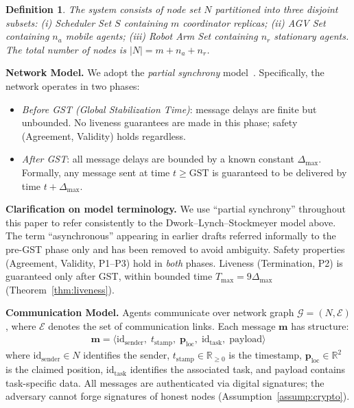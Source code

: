 \documentclass[manuscript,screen,review]{acmart}
\newtheorem{definition}{Definition}
\begin{document}
\begin{definition}
The system consists of node set $N$ partitioned into three disjoint subsets: (i) \textit{Scheduler Set} $S$ containing $m$ coordinator replicas; (ii) \textit{AGV Set} containing $n_a$ mobile agents; (iii) \textit{Robot Arm Set} containing $n_r$ stationary agents. The total number of nodes is $|N| = m + n_a + n_r$.
\end{definition}

\textbf{Network Model.}
We adopt the \textit{partial synchrony} model~\cite{dwork1988consensus}. Specifically, the network operates in two phases:
\begin{itemize}
    \item \textit{Before GST (Global Stabilization Time)}: message delays are finite but unbounded. No liveness guarantees are made in this phase; safety (Agreement, Validity) holds regardless.
    \item \textit{After GST}: all message delays are bounded by a known constant $\Delta_{\max}$. Formally, any message sent at time $t \geq \text{GST}$ is guaranteed to be delivered by time $t + \Delta_{\max}$.
\end{itemize}

\textbf{Clarification on model terminology.}
We use ``partial synchrony'' throughout this paper to refer consistently to the Dwork--Lynch--Stockmeyer model above. The term ``asynchronous'' appearing in earlier drafts referred informally to the pre-GST phase only and has been removed to avoid ambiguity. Safety properties (Agreement, Validity, P1--P3) hold in \emph{both} phases. Liveness (Termination, P2) is guaranteed only after GST, within bounded time $T_{\max} = 9\Delta_{\max}$ (Theorem~\ref{thm:liveness}).

\textbf{Communication Model.}
Agents communicate over network graph $\mathcal{G} = (N, \mathcal{E})$, where $\mathcal{E}$ denotes the set of communication links. Each message $\mathbf{m}$ has structure:
\begin{equation}
\begin{aligned}
\mathbf{m} = \langle \text{id}_{\text{sender}},\; t_{\text{stamp}},\; \mathbf{p}_{\text{loc}},\; \text{id}_{\text{task}},\; \text{payload} \rangle
\end{aligned}
\end{equation}
where $\text{id}_{\text{sender}} \in N$ identifies the sender, $t_{\text{stamp}} \in \mathbb{R}_{\geq 0}$ is the timestamp, $\mathbf{p}_{\text{loc}} \in \mathbb{R}^2$ is the claimed position, $\text{id}_{\text{task}}$ identifies the associated task, and $\text{payload}$ contains task-specific data. All messages are authenticated via digital signatures; the adversary cannot forge signatures of honest nodes (Assumption~\ref{assump:crypto}).
\end{document}
